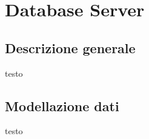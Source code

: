 \section{Database Server}
\subsection{Descrizione generale}
testo
\subsection{Modellazione dati}
testo